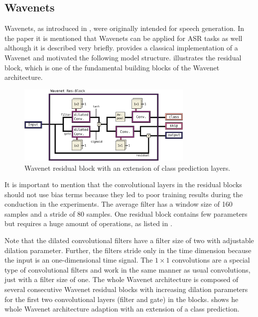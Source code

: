 \subsection{Wavenets}\label{sec:nn_arch_wavenet}
Wavenets, as introduced in \cite{Oord2016}, were originally intended for speech generation.
In the paper it is mentioned that Wavenets can be applied for ASR tasks as well although it is described very briefly.
\cite{Herrmann2018} provides a classical implementation of a Wavenet and motivated the following model structure.
 illustrates the residual block, which is one of the fundamental building blocks of the Wavenet architecture.
\begin{figure}[!ht]
  \centering
    \includegraphics[width=0.75\textwidth]{./4_nn/figs/nn_arch_wavenet_block.pdf}
  \caption{Wavenet residual block \cite{Oord2016} with an extension of class prediction layers.}
  \label{fig:nn_arch_wavenet_block}
\end{figure}
\FloatBarrier
\noindent
It is important to mention that the convolutional layers in the residual blocks should not use bias terms because they led to poor training results during the conduction in the experiments.
The average filter has a window size of 160 samples and a stride of 80 samples.
One residual block contains few parameters but requires a huge amount of operations, as listed in .

Note that the dilated convolutional filters have a filter size of two with adjustable dilation parameter.
Further, the filters stride only in the time dimension because the input is an one-dimensional time signal.
The $1 \times 1$ convolutions are a special type of convolutional filters and work in the same manner as usual convolutions, just with a filter size of one.
The whole Wavenet architecture is composed of several consecutive Wavenet residual blocks with increasing dilation parameters for the first two convolutional layers (filter and gate) in the blocks.
 shows he whole Wavenet architecture adaption with an extension of a class prediction.
